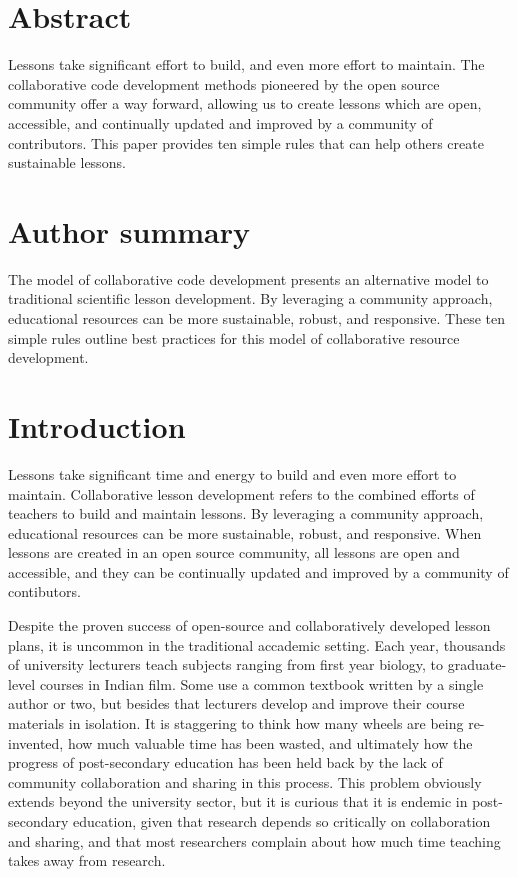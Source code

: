 \documentclass[10pt,letterpaper]{article}
\begin{document}

\linenumbers

\section*{Abstract}

Lessons take significant effort to build,
and even more effort to maintain.
The collaborative code development methods pioneered by the open source community
offer a way forward,
allowing us to create lessons which are open,
accessible,
and continually updated and improved by a community of contributors.
This paper provides ten simple rules that can help others create sustainable lessons.

\section*{Author summary}

The model of collaborative code development presents an
alternative model to traditional scientific lesson
development. By leveraging a community approach, educational
resources can be more sustainable, robust, and responsive.
These ten simple rules outline best practices for this model of
collaborative resource development.


\section*{Introduction}

Lessons take significant time and energy to build and even more effort to maintain.
Collaborative lesson development refers to the combined efforts of teachers to build and maintain lessons.
By leveraging a community approach, educational resources can be more sustainable, robust, and responsive.
When lessons are created in an open source community, all lessons are open and accessible,
and they can be continually updated and improved by a community of contibutors.

Despite the proven success of open-source and collaboratively developed lesson plans,
it is uncommon in the traditional accademic setting.
Each year, thousands of university lecturers teach subjects ranging from first year biology,
to graduate-level courses in Indian film.
Some use a common textbook written by a single author or two,
but besides that lecturers develop and improve their course materials in isolation.
It is staggering to think how many wheels are being re-invented,
how much valuable time has been wasted,
and ultimately how the progress of post-secondary education has been held back by
the lack of community collaboration and sharing in this process.
This problem obviously extends beyond the university sector,
but it is curious that it is endemic in post-secondary education,
given that research depends so critically on collaboration and sharing,
and that most researchers complain about how much time teaching takes away from research.
\end{document}
